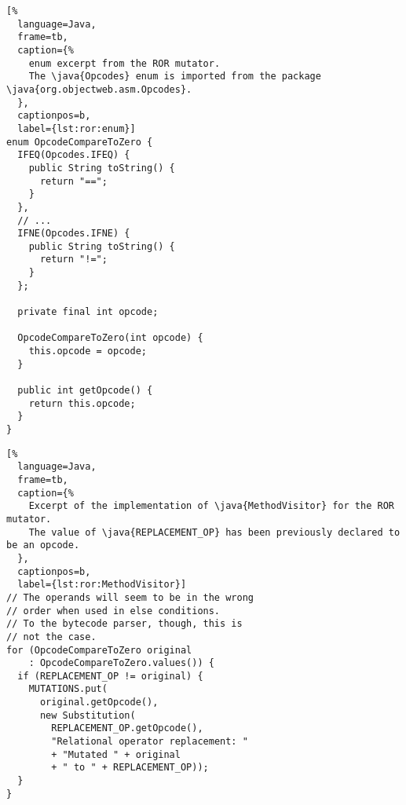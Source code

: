 \begin{lstlisting}[%
  language=Java,
  frame=tb,
  caption={%
    enum excerpt from the ROR mutator.
    The \java{Opcodes} enum is imported from the package \java{org.objectweb.asm.Opcodes}.
  },
  captionpos=b,
  label={lst:ror:enum}]
enum OpcodeCompareToZero {
  IFEQ(Opcodes.IFEQ) {
    public String toString() {
      return "==";
    }
  },
  // ...
  IFNE(Opcodes.IFNE) {
    public String toString() {
      return "!=";
    }
  };

  private final int opcode;

  OpcodeCompareToZero(int opcode) {
    this.opcode = opcode;
  }

  public int getOpcode() {
    return this.opcode;
  }
}
\end{lstlisting}

\begin{lstlisting}[%
  language=Java,
  frame=tb,
  caption={%
    Excerpt of the implementation of \java{MethodVisitor} for the ROR mutator.
    The value of \java{REPLACEMENT_OP} has been previously declared to be an opcode.
  },
  captionpos=b,
  label={lst:ror:MethodVisitor}]
// The operands will seem to be in the wrong
// order when used in else conditions.
// To the bytecode parser, though, this is
// not the case.
for (OpcodeCompareToZero original
    : OpcodeCompareToZero.values()) {
  if (REPLACEMENT_OP != original) {
    MUTATIONS.put(
      original.getOpcode(),
      new Substitution(
        REPLACEMENT_OP.getOpcode(),
        "Relational operator replacement: "
        + "Mutated " + original
        + " to " + REPLACEMENT_OP));
  }
}
\end{lstlisting}
